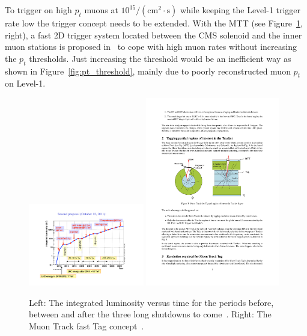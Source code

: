 To trigger on high $p_t$ muons at $10^{35}/(\mathrm{cm}^2 \cdot\mathrm{s})$ while keeping the Level-1 trigger rate low the trigger concept needs to be extended. With the MTT (see 
Figure~\ref{fig:schedule_concept}, right), a fast 2D trigger system located between the CMS solenoid and the inner muon stations is proposed in~\cite{mtt_concept} to cope with high 
muon rates without increasing the $p_t$ thresholds. Just increasing the threshold would be an inefficient way as shown in Figure~\ref{fig:pt_threshold}, mainly due to poorly 
reconstructed muon $p_t$ on Level-1. 
\begin{figure}[htbp]
\centering
\includegraphics[width=0.45\textwidth]{Figures/pooth/schedule.pdf}
\includegraphics[width=0.52\textwidth]{Figures/pooth/mtt_concept_a.pdf}
\caption{Left: The integrated luminosity versus time for the periods before, between and after the three long shutdowns to come~\cite{schedule}. Right: The Muon Track fast Tag concept~\cite{mtt_concept}. } 
\label{fig:schedule_concept}
\end{figure}

